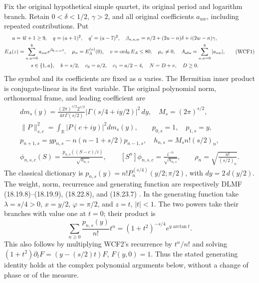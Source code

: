 \documentclass[11pt,a4paper]{article}
\begin{document}
Fix the original hypothetical simple quartet, its original period and
logarithm branch. Retain $0<\delta<1/2$, $\gamma>2$, and all original
coefficients $a_{uw}$, including repeated contributions. Put
\[
\begin{gathered}
 a=4l+1\ge9,\quad q=(a+1)^2,\quad q'=(a-7)^2,\quad
 \beta_{n,u,w}=n/2+(2u-n)\delta+i(2w-n)\gamma,\\
 E_A(z)=\sum_{u,w=0}^{8}a_{uw}e^{\beta_{8,u,w}z},\quad
 \mu_n=E_A^{(n)}(0),\quad v=\operatorname{ord}_0E_A\le80,
 \quad \mu_v\ne0,\quad A_{\rm abs}=\sum_{u,w=0}^{8}|a_{uw}|,\\
 s\in\{1,a\},\quad b=s/2,\quad c_0=a/2,\quad c_1=a/2-4,
 \quad N=D+v,\quad D\ge0.
\end{gathered}\tag{WCF1}
\]
The symbol and its coefficients are fixed as $a$ varies. The Hermitian
inner product is conjugate-linear in its first variable. The original
polynomial norm, orthonormal frame, and leading coefficient are
\[
\begin{gathered}
 dm_s(y)=\frac{(2\pi)^{s/2}2^{s/2}}{4\pi\Gamma(s/2)}
       |\Gamma(s/4+iy/2)|^2\,dy,\quad M_s=(2\pi)^{s/2},\\
 \|P\|_{s,c}^2=\int_{\mathbb R}|P(c+iy)|^2dm_s(y),\qquad
 p_{0,s}=1,\quad p_{1,s}=y,\\
 p_{n+1,s}=yp_{n,s}-n(n-1+s/2)p_{n-1,s},\quad
 h_{n,s}=M_sn!(s/2)_n,\\
 \phi_{n,s,c}(S)=\frac{p_{n,s}((S-c)/i)}{\sqrt{h_{n,s}}},\qquad
 [S^n]\phi_{n,s,c}=\frac{i^{-n}}{\sqrt{h_{n,s}}},\qquad
 \rho_n=\sqrt{\frac{n!}{(s/2)_n}}.
\end{gathered}\tag{WCF2}
\]
The classical dictionary is
$p_{n,s}(y)=n!P_n^{(s/4)}(y/2;\pi/2)$, with $dy=2\,d(y/2)$.
The weight, norm, recurrence and generating function are respectively
DLMF (18.19.8)--(18.19.9), (18.22.8), and (18.23.7)
\cite{human:dlmf18}. In the generating function take
$\lambda=s/4>0$, $x=y/2$, $\varphi=\pi/2$, and $z=t$, $|t|<1$.
The two powers take their branches with value one at $t=0$; their product is
\[
 \sum_{n\ge0}\frac{p_{n,s}(y)}{n!}t^n
   =(1+t^2)^{-s/4}e^{y\arctan t}.
 \tag{WCF3}
\]
This also follows by multiplying WCF2's recurrence by $t^n/n!$ and
solving $(1+t^2)\partial_t F=(y-(s/2)t)F$, $F(y,0)=1$.
Thus the stated generating identity holds at the complex polynomial
arguments below, without a change of phase or of the measure.
\end{document}
